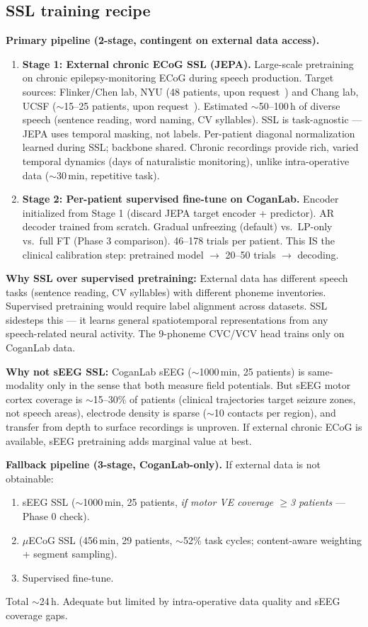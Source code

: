 \documentclass[11pt,letterpaper]{article}
\begin{document}
\subsection{SSL training recipe}

\textbf{Primary pipeline (2-stage, contingent on external data access).}
\begin{enumerate}[leftmargin=2em]
\item \textbf{Stage 1: External chronic ECoG SSL (JEPA).} Large-scale pretraining on chronic epilepsy-monitoring ECoG during speech production. Target sources: Flinker/Chen lab, NYU (48 patients, upon request~\cite{chen2024}) and Chang lab, UCSF (${\sim}$15--25 patients, upon request~\cite{anumanchipalli2019}). Estimated ${\sim}$50--100\,h of diverse speech (sentence reading, word naming, CV syllables). SSL is task-agnostic --- JEPA uses temporal masking, not labels. Per-patient diagonal normalization learned during SSL; backbone shared. Chronic recordings provide rich, varied temporal dynamics (days of naturalistic monitoring), unlike intra-operative data (${\sim}$30\,min, repetitive task).
\item \textbf{Stage 2: Per-patient supervised fine-tune on CoganLab.} Encoder initialized from Stage 1 (discard JEPA target encoder + predictor). AR decoder trained from scratch. Gradual unfreezing (default) vs.\ LP-only vs.\ full FT (Phase 3 comparison). 46--178 trials per patient. This IS the clinical calibration step: pretrained model $\to$ 20--50 trials $\to$ decoding.
\end{enumerate}

\textbf{Why SSL over supervised pretraining:} External data has different speech tasks (sentence reading, CV syllables) with different phoneme inventories. Supervised pretraining would require label alignment across datasets. SSL sidesteps this --- it learns general spatiotemporal representations from any speech-related neural activity. The 9-phoneme CVC/VCV head trains only on CoganLab data.

\textbf{Why not sEEG SSL:} CoganLab sEEG (${\sim}$1000\,min, 25 patients) is same-modality only in the sense that both measure field potentials. But sEEG motor cortex coverage is ${\sim}$15--30\% of patients (clinical trajectories target seizure zones, not speech areas), electrode density is sparse (${\sim}$10 contacts per region), and transfer from depth to surface recordings is unproven. If external chronic ECoG is available, sEEG pretraining adds marginal value at best.

\textbf{Fallback pipeline (3-stage, CoganLab-only).} If external data is not obtainable:
\begin{enumerate}[leftmargin=2em]
\item sEEG SSL (${\sim}$1000\,min, 25 patients, \textit{if motor VE coverage $\geq$3 patients} --- Phase 0 check).
\item $\mu$ECoG SSL (456\,min, 29 patients, ${\sim}$52\% task cycles; content-aware weighting + segment sampling).
\item Supervised fine-tune.
\end{enumerate}
Total ${\sim}$24\,h. Adequate but limited by intra-operative data quality and sEEG coverage gaps.
\end{document}
